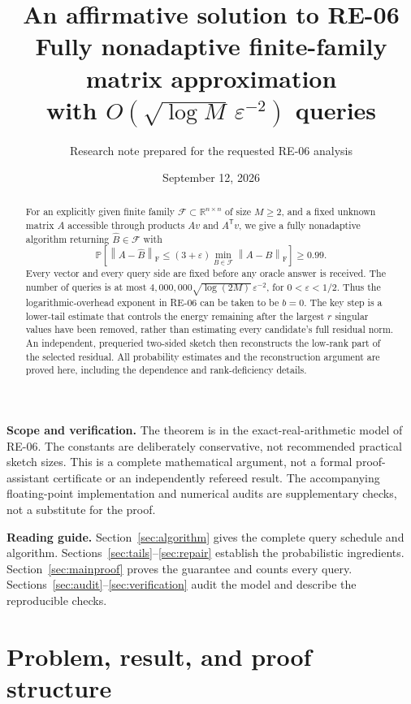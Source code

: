 \documentclass[11pt]{article}
\title{\vspace{-1.5em}\textbf{An affirmative solution to RE-06}\\[0.4em]\large Fully nonadaptive finite-family matrix approximation\\with $O(\sqrt{\log M}\,\varepsilon^{-2})$ queries}
\author{Research note prepared for the requested RE-06 analysis}
\date{September 12, 2026}
\numberwithin{equation}{section}
\theoremstyle{remark}
\newcommand{\R}{\mathbb R}
\newcommand{\Prob}{\mathbb P}
\newcommand{\F}{\mathcal F}
\newcommand{\norm}[1]{\left\lVert #1\right\rVert_{\mathrm F}}
\newcommand{\T}{\mathsf T}
\begin{document}
\maketitle
\thispagestyle{empty}
\begin{abstract}
For an explicitly given finite family $\F\subset\R^{n\times n}$ of size $M\ge2$, and a fixed unknown matrix $A$ accessible through products $Av$ and $A^\T v$, we give a fully nonadaptive algorithm returning $\widehat B\in\F$ with
\[
 \Prob\!\left[\norm{A-\widehat B}\le(3+\varepsilon)
             \min_{B\in\F}\norm{A-B}\right]\ge0.99.
\]
Every vector and every query side are fixed before any oracle answer is received. The number of queries is at most
$4{,}000{,}000\sqrt{\log(2M)}\,\varepsilon^{-2}$, for $0<\varepsilon<1/2$.
Thus the logarithmic-overhead exponent in RE-06 can be taken to be $b=0$.
The key step is a lower-tail estimate that controls the energy remaining after the largest $r$ singular values have been removed, rather than estimating every candidate's full residual norm. An independent, prequeried two-sided sketch then reconstructs the low-rank part of the selected residual. All probability estimates and the reconstruction argument are proved here, including the dependence and rank-deficiency details.
\end{abstract}

\vspace{0.4em}
\noindent\textbf{Scope and verification.}
The theorem is in the exact-real-arithmetic model of RE-06. The constants are deliberately conservative, not recommended practical sketch sizes. This is a complete mathematical argument, not a formal proof-assistant certificate or an independently refereed result. The accompanying floating-point implementation and numerical audits are supplementary checks, not a substitute for the proof.

\vspace{0.4em}
\noindent\textbf{Reading guide.}
Section~\ref{sec:algorithm} gives the complete query schedule and algorithm.
Sections~\ref{sec:tails}--\ref{sec:repair} establish the probabilistic ingredients.
Section~\ref{sec:mainproof} proves the guarantee and counts every query.
Sections~\ref{sec:audit}--\ref{sec:verification} audit the model and describe the reproducible checks.

\newpage
\section{Problem, result, and proof structure}\label{sec:problem}
\end{document}

